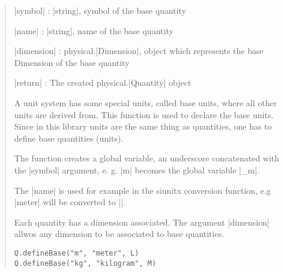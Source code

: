 \documentclass{ltxdoc}
\begin{document}
\begin{quote}
  \begin{description}
  \item |symbol| : |string|, symbol of the base quantity

  \item |name| : |string|, name of the base quantity

  \item |dimension| : physical.|Dimension|, object which represents the base Dimension of the base quantity

  \item |return| : The created physical.|Quantity| object
  \end{description}

  A unit system has some special units, called base units, where all other units are derived from. This function is used to declare the base units. Since in this library units are the same thing as quantities, one has to define base quantities (units). 

  The function creates a global variable, an underscore concatenated with the |symbol| argument, e. g. |m| becomes the global variable |_m|.

  The |name| is used for example in the siunitx conversion function, e.g |meter| will be converted to |\meter|. 

  Each quantity has a dimension associated. The argument |dimension| allwos any dimension to be associated to base quantities. 

  
  \begin{lstlisting}
Q.defineBase("m", "meter", L)
Q.defineBase("kg", "kilogram", M)
  \end{lstlisting}
\end{quote}
\end{document}
